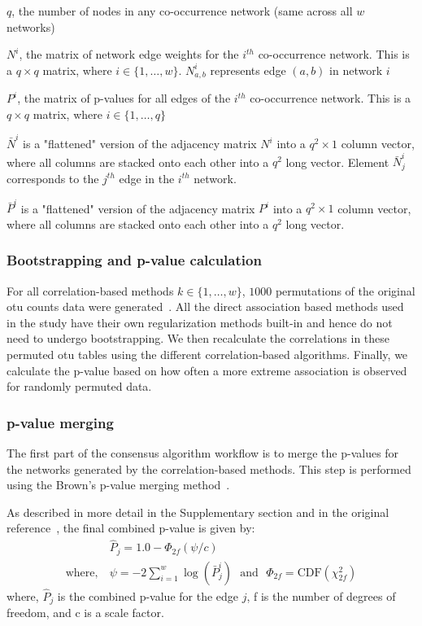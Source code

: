  $q$, the number of nodes in any co-occurrence network (same across all $w$ networks)

  $N^i$, the matrix of network edge weights for the $i^{th}$ co-occurrence network. This is a $q \times q$ matrix, where $i \in \{1,\dots,w\}$. $N^i_{a,b}$ represents edge $(a,b)$ in network $i$

  $P^i$, the matrix of p-values for all edges of the $i^{th}$ co-occurrence network. This is a $q \times q$ matrix, where $i \in \{1,\dots,q\}$

  $\bar{N}^i$ is a "flattened" version of the adjacency matrix $N^i$ into a $q^2 \times 1$ column vector, where all columns are stacked onto each other into a $q^2$ long vector. Element $\bar{N}^i_j$ corresponds to the $j^{th}$ edge in the $i^{th}$ network.

  $\bar{P}^i$ is a "flattened" version of the adjacency matrix $P^i$ into a $q^2 \times 1$ column vector, where all columns are stacked onto each other into a $q^2$ long vector.

  \subsubsection*{Bootstrapping and p-value calculation}
  For all correlation-based methods $k \in \{1,\dots,w\}$, $1000$ permutations of the original \ac{otu} counts data were generated~\cite{Watts2018}.
  All the direct association based methods used in the study have their own regularization methods built-in and hence do not need to undergo bootstrapping.
  We then recalculate the correlations in these permuted \ac{otu} tables using the different correlation-based algorithms.
  Finally, we calculate the p-value based on how often a more extreme association is observed for randomly permuted data.

  \subsubsection*{p-value merging}

  The first part of the consensus algorithm workflow is to merge the p-values for the networks generated by the correlation-based methods.
  This step is performed using the Brown's p-value merging method~\cite{Poole_Gibbs_Shmulevich_Bernard_Knijnenburg_2016,faustCoNetAppInference2016}.

  As described in more detail in the Supplementary section and in the original reference~\cite{Poole_Gibbs_Shmulevich_Bernard_Knijnenburg_2016}, the final combined p-value is given by:
  \begin{equation}
    \begin{aligned}
        & \hat{P}_j = 1.0 - \Phi_{2f}\left( \psi / c \right) \\
        \text{where},~ &\psi = -2 \sum_{i=1}^w \log(\bar{P}^i_j) ~~~\text{and}~~~ \Phi_{2f} = \mathrm{CDF}\left( \chi^2_{2f} \right)
    \end{aligned}
    \label{eqn:pvalue-combined}
  \end{equation}
  where, $\hat{P}_j$ is the combined p-value for the edge $j$, f is the number of degrees of freedom, and c is a scale factor.

